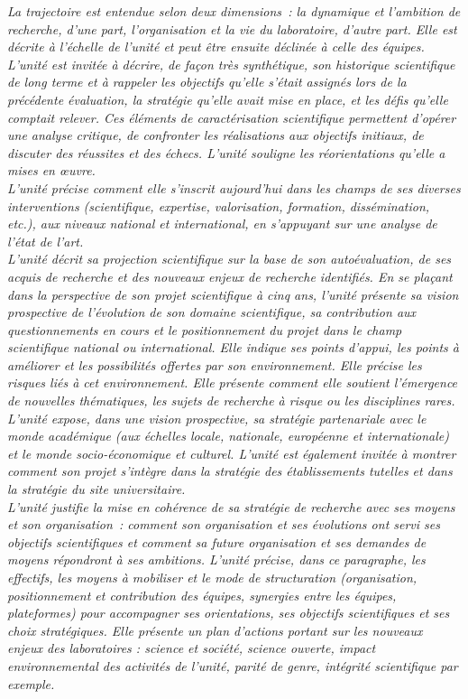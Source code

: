 \documentclass[]{article}
\newcommand{\instructions}[1]{{\em \color{hceresgreen}#1}}
\begin{document}
\instructions{La trajectoire est entendue selon deux dimensions : la dynamique et l’ambition de recherche, d’une part, l’organisation et la vie du laboratoire, d’autre part. Elle est décrite à l’échelle de l’unité et peut être ensuite déclinée à celle des équipes.
L’unité est invitée à décrire, de façon très synthétique, son historique scientifique de long terme et à rappeler les objectifs qu’elle s’était assignés lors de la précédente évaluation, la stratégie qu’elle avait mise en place, et les défis qu’elle comptait relever. Ces éléments de caractérisation scientifique permettent d’opérer une analyse critique, de confronter les réalisations aux objectifs initiaux, de discuter des réussites et des échecs. L’unité souligne les réorientations qu’elle a mises en œuvre.\\

L’unité précise comment elle s’inscrit aujourd’hui dans les champs de ses diverses interventions (scientifique, expertise, valorisation, formation, dissémination, etc.), aux niveaux national et international, en s’appuyant sur une analyse de l’état de l’art.\\

L’unité décrit sa projection scientifique sur la base de son autoévaluation, de ses acquis de recherche et des nouveaux enjeux de recherche identifiés. En se plaçant dans la perspective de son projet scientifique à cinq ans, l’unité présente sa vision prospective de l’évolution de son domaine scientifique, sa contribution aux questionnements en cours et le positionnement du projet dans le champ scientifique national ou international. Elle indique ses points d’appui, les points à améliorer et les possibilités offertes par son environnement. Elle précise les risques liés à cet environnement. Elle présente comment elle soutient l’émergence de nouvelles thématiques, les sujets de recherche à risque ou les disciplines rares.\\

L’unité expose, dans une vision prospective, sa stratégie partenariale avec le monde académique (aux échelles locale, nationale, européenne et internationale) et le monde socio-économique et culturel. L’unité est également invitée à montrer comment son projet s’intègre dans la stratégie des établissements tutelles et dans la stratégie du site universitaire.\\

L’unité justifie la mise en cohérence de sa stratégie de recherche avec ses moyens et son organisation : comment son organisation et ses évolutions ont servi ses objectifs scientifiques et comment sa future organisation et ses demandes de moyens répondront à ses ambitions. L’unité précise, dans ce paragraphe, les effectifs, les moyens à mobiliser et le mode de structuration (organisation,  positionnement  et contribution des équipes, synergies entre les équipes, plateformes) pour accompagner ses orientations, ses objectifs scientifiques et ses choix stratégiques. Elle présente un plan d’actions portant sur les nouveaux enjeux des laboratoires : science et société, science ouverte, impact environnemental des activités de l'unité, parité de genre, intégrité scientifique par exemple.
}
\end{document}
